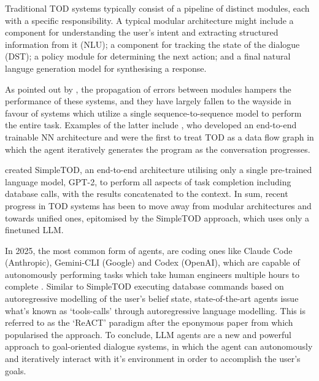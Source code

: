 \documentclass[11pt]{article}
\begin{document}
Traditional TOD systems typically consist of a pipeline of distinct modules, each with a specific responsibility.
A typical modular architecture might include a component for understanding the user's intent and extracting structured information from it (NLU); a component for tracking the state of the dialogue (DST); a policy module for determining the next action; and a final natural languge generation model for synthesising a response.  

As pointed out by \citet{yi_survey_2025}, the propagation of errors between modules hampers the performance of these systems, and they have largely fallen to the wayside in favour of systems which utilize a single sequence-to-sequence model to perform the entire task.
Examples of the latter include \citet{wen_network-based_2017}, who developed an end-to-end trainable NN architecture and \citet{andreas_task-oriented_2020} were the first to treat TOD as a data flow graph in which the agent iteratively generates the program as the conversation progresses.

\citet{hosseini-asl_simple_2022} created SimpleTOD, an end-to-end architecture utilising only a single pre-trained language model, GPT-2, to perform all aspects of task completion including database calls, with the results concatenated to the context.
In sum, recent progress in TOD systems has been to move away from modular architectures and towards unified ones, epitomised by the SimpleTOD approach, which uses only a finetuned LLM. 


In 2025, the most common form of agents, are coding ones like Claude Code (Anthropic), Gemini-CLI (Google) and Codex (OpenAI), which are capable of autonomously performing tasks which take human engineers multiple hours to complete \cite{kwa_measuring_2025}.
Similar to SimpleTOD executing database commands based on autoregressive modelling of the user's belief state, state-of-the-art agents issue what's known as `tools-calls' through autoregressive language modelling. This is referred to as the `ReACT' paradigm after the eponymous paper from \citet{yao_reac_2023} which popularised the approach. To conclude, LLM agents are a new and powerful approach to goal-oriented dialogue systems, in which the agent can autonomously and iteratively interact with it's environment in order to accomplish the user's goals.
\end{document}
